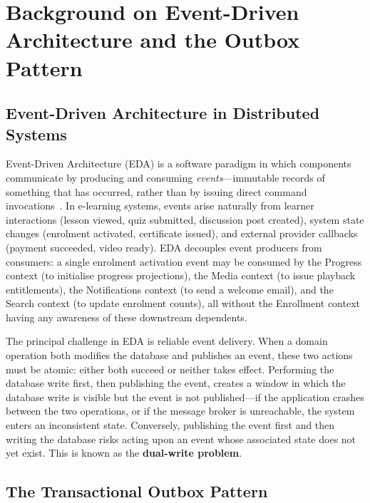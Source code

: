 
\section{Background on Event-Driven Architecture and the Outbox Pattern}
\label{sec:event-driven-outbox}

\subsection{Event-Driven Architecture in Distributed Systems}

Event-Driven Architecture (EDA) is a software paradigm in which components communicate by producing and consuming \textit{events}---immutable records of something that has occurred, rather than by issuing direct command invocations~\cite{fowler2005eda}. In e-learning systems, events arise naturally from learner interactions (lesson viewed, quiz submitted, discussion post created), system state changes (enrolment activated, certificate issued), and external provider callbacks (payment succeeded, video ready). EDA decouples event producers from consumers: a single enrolment activation event may be consumed by the Progress context (to initialise progress projections), the Media context (to issue playback entitlements), the Notifications context (to send a welcome email), and the Search context (to update enrolment counts), all without the Enrollment context having any awareness of these downstream dependents.

The principal challenge in EDA is reliable event delivery. When a domain operation both modifies the database and publishes an event, these two actions must be atomic: either both succeed or neither takes effect. Performing the database write first, then publishing the event, creates a window in which the database write is visible but the event is not published---if the application crashes between the two operations, or if the message broker is unreachable, the system enters an inconsistent state. Conversely, publishing the event first and then writing the database risks acting upon an event whose associated state does not yet exist. This is known as the \textbf{dual-write problem}.

\subsection{The Transactional Outbox Pattern}

